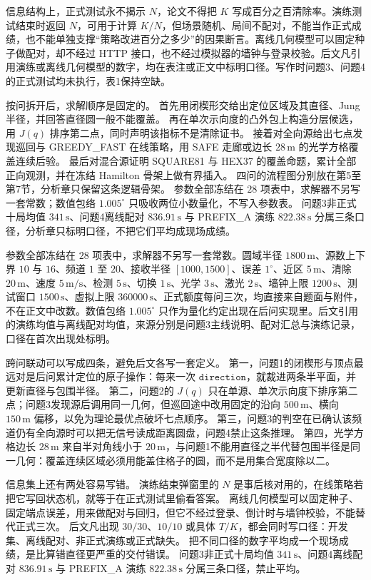 信息结构上，正式测试永不揭示 $N$，论文不得把 $K$ 写成百分之百清除率。演练测试结束时返回 $N$，可用于计算 $K/N$，但场景随机、局间不配对，不能当作正式成绩，也不能单独支撑“策略改进百分之多少”的因果断言。离线几何模型可以固定种子做配对，却不经过 HTTP 接口，也不经过模拟器的墙钟与登录校验。后文凡引用演练或离线几何模型的数字，均在表注或正文中标明口径。写作时问题3、问题4的正式测试均未执行，表1保持空缺。

按问拆开后，求解顺序是固定的。
首先用闭楔形交给出定位区域及其直径、Jung 半径，并回答直径圆一般不能覆盖。
再在单次示向度的凸外包上构造分层候选，用 $J(q)$ 排序第二点，同时声明该指标不是清除证书。
接着对全向源给出七点发现巡回与 GREEDY\_FAST 在线策略，用 SAFE 走廊或边长 $28\,\mathrm{m}$ 的光学方格覆盖连续后验。
最后对混合源证明 SQUARE81 与 HEX37 的覆盖命题，累计全部正向观测，并在冻结 Hamilton 骨架上做有界插入。
四问的流程图分别放在第5至第7节，分析章只保留这条逻辑骨架。
参数全部冻结在 $28$ 项表中，求解器不另写一套常数；数值包络 $1.005^\circ$ 只吸收两位小数量化，不写入参数表。
问题3非正式十局均值 $341\,\mathrm{s}$、问题4离线配对 $836.91\,\mathrm{s}$ 与 PREFIX\_A 演练 $822.38\,\mathrm{s}$ 分属三条口径，分析章只标明口径，不把它们平均成现场成绩。

参数全部冻结在 $28$ 项表中，求解器不另写一套常数。圆域半径 $1800\,\mathrm{m}$、源数上下界 $10$ 与 $16$、频道 $1$ 至 $20$、接收半径 $[1000,1500]$、误差 $1^\circ$、近区 $5\,\mathrm{m}$、清除 $20\,\mathrm{m}$、速度 $5\,\mathrm{m/s}$、检测 $5\,\mathrm{s}$、切换 $1\,\mathrm{s}$、光学 $3\,\mathrm{s}$、激光 $2\,\mathrm{s}$、墙钟上限 $1200\,\mathrm{s}$、测试窗口 $1500\,\mathrm{s}$、虚拟上限 $360000\,\mathrm{s}$、正式额度每问三次，均直接来自题面与附件，不在正文中改数。数值包络 $1.005^\circ$ 只作为量化约定出现在后问实现里。后文引用的演练均值与离线配对均值，来源分别是问题3主线说明、配对汇总与演练记录，口径在首次出现处标明。

跨问联动可以写成四条，避免后文各写一套定义。
第一，问题1的闭楔形与顶点最远对是后问累计定位的原子操作：每来一次 $\mathtt{direction}$，就裁进两条半平面，并更新直径与包围半径。
第二，问题2的 $J(q)$ 只在单源、单次示向度下排序第二点；问题3发现源后调用同一几何，但巡回途中改用固定的沿向 $500\,\mathrm{m}$、横向 $150\,\mathrm{m}$ 偏移，以免为理论最优点破坏七点顺序。
第三，问题3的判空在已确认该频道仍有全向源时可以把无信号读成距离圆盘，问题4禁止这条推理。
第四，光学方格边长 $28\,\mathrm{m}$ 来自半对角线小于 $20\,\mathrm{m}$，与问题1不能用直径之半代替包围半径是同一几何：覆盖连续区域必须用能盖住格子的圆，而不是用集合宽度除以二。

信息集上还有两处容易写错。
演练结束弹窗里的 $N$ 是事后核对用的，在线策略若把它写回状态机，就等于在正式测试里偷看答案。
离线几何模型可以固定种子、固定端点误差，用来做配对与回归，但它不经过登录、倒计时与墙钟校验，不能替代正式三次。
后文凡出现 $30/30$、$10/10$ 或具体 $T/K$，都会同时写口径：开发集、离线配对、非正式演练或正式缺失。
把不同口径的数字平均成一个现场成绩，是比算错直径更严重的交付错误。
问题3非正式十局均值 $341\,\mathrm{s}$、问题4离线配对 $836.91\,\mathrm{s}$ 与 PREFIX\_A 演练 $822.38\,\mathrm{s}$ 分属三条口径，禁止平均。
